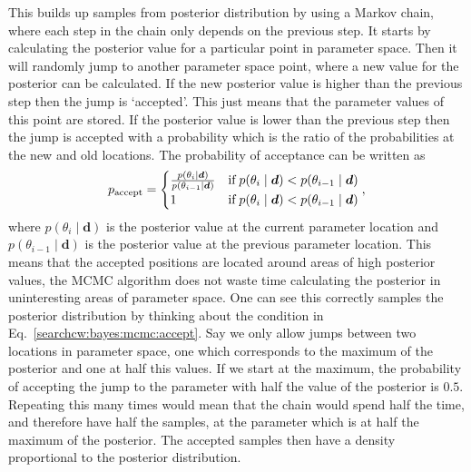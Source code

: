 This builds up samples from posterior distribution by using a Markov chain, where each
step in the chain only depends on the previous step.  
It starts by calculating the posterior value for a particular point in parameter space. Then it will
randomly jump to another parameter space point, where a new value for the
posterior can be calculated.  If the new posterior value is higher than the
previous step then the jump is `accepted'. This just means that the parameter
values of this point are stored.  If the posterior value is lower than the
previous step then the jump is accepted with a probability which is the ratio of the probabilities at the new and old locations.
The probability of acceptance can be written as
\begin{equation}
\label{searchcw:bayes:mcmc:accept}
	p_{\rm{accept}} = 
	\begin{cases}
		\frac{p(\theta_i \mid \bm{d})}{p(\theta_{i-1} \mid \bm{d})} & \text{if} \; p(\theta_i \mid \bm{d}) < p(\theta_{i-1} \mid \bm{d}) \\
		1 & \text{if} \; p(\theta_i \mid \bm{d}) < p(\theta_{i-1} \mid \bm{d}) \\
	\end{cases},
\end{equation}
where $p(\theta_i \mid \bm{d})$ is the posterior value at the current parameter location and $p(\theta_{i-1} \mid \bm{d})$ is the posterior value at the previous parameter location. 
This means that the accepted positions are located around areas of high
posterior values, the \gls{MCMC} algorithm does not waste time calculating the
posterior in uninteresting areas of parameter space.  
One can see this correctly samples the posterior distribution by thinking about the condition in Eq.~\ref{searchcw:bayes:mcmc:accept}. Say we only allow jumps between two locations in parameter space, one which corresponds to the maximum of the posterior and one at half this values. 
If we start at the maximum, the probability of accepting the jump to the parameter with half the value of the posterior is $0.5$. Repeating this many times would mean that the chain would spend half the time, and therefore have half the samples, at the parameter which is at half the maximum of the posterior. 
The accepted samples then have a density proportional to the posterior distribution. 
%

